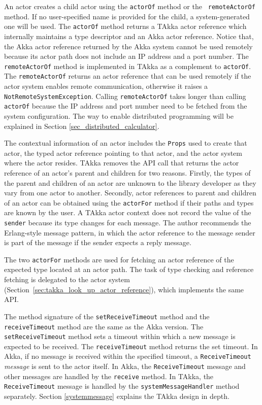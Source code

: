 An actor creates a child actor using the {\tt actorOf} method or the {\tt 
remoteActorOf} method.  If no user-specified name is provided for the child, a 
system-generated one will be used.  The {\tt actorOf} method returns a TAkka 
actor reference which internally maintains a type descriptor and an Akka actor 
reference.  Notice that, the Akka actor reference returned by the Akka system 
cannot be used remotely because its actor path does not include an IP address 
and a port number.  The {\tt remoteActorOf} method is implemented in TAkka as a 
complement to {\tt actorOf}.  The {\tt remoteActorOf} returns an actor 
reference that can be used remotely if the actor system enables remote 
communication, otherwise it raises a {\tt NotRemoteSystemException}.  Calling 
{\tt remoteActorOf} takes longer than calling {\tt actorOf} because the IP 
address and port number need to be fetched from the system configuration.
The way to enable distributed programming will be explained in Section 
\ref{sec_distributed_calculator}.


The contextual information of an actor includes the {\tt Props} used to create 
that actor, the typed actor reference pointing to that actor, and the actor 
system where the actor resides.  TAkka removes the API call that returns the 
actor reference of an actor's parent and children for two reasons.  Firstly, 
the types of the parent and children of an actor are unknown to the library 
developer as they vary from one actor to another.  Secondly, actor references 
to parent and children of an actor can be obtained using the {\tt actorFor} 
method if their paths and types are known by the user.  A TAkka actor context 
does not record the value of the {\tt sender} because its type changes for each 
message.  The author recommends the Erlang-style message pattern, in which the 
actor reference to the message sender is part of the message if the sender 
expects a reply message.

The two {\tt actorFor} methods are used for fetching an actor reference of the 
expected type located at an actor path.  The task of type checking and 
reference fetching is
delegated to the actor system (Section~\ref{sec:takka_look_up_actor_reference}),
which implements the same API.

The method signature of the {\tt setReceiveTimeout} method and the \\
{\tt receiveTimeout} method are the same as the Akka version.  The
{\tt setReceiveTimeout} method sets a timeout within which a 
new message is expected to be received.  The {\tt receiveTimeout} method returns
the set timeout.  In Akka, if no message is received within the specified 
timeout, a {\tt ReceiveTimeout} {\it message} is sent to the actor itself.  
In Akka, the {\tt ReceiveTimeout} message and other messages are handled by the 
{\tt receive} method.  In TAkka, the {\tt ReceiveTimeout} message is 
handled by the {\tt systemMessageHandler} method separately.  Section 
\ref{systemmessage} explains the TAkka design in depth.

